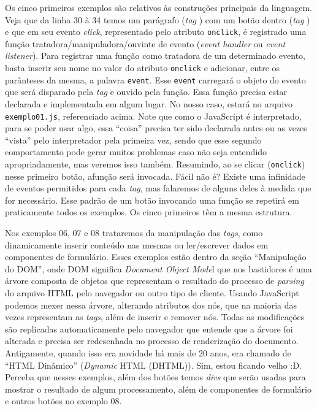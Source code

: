 Os cinco primeiros exemplos são relativos às construções principais da linguagem. Veja que da linha 30 à 34 temos um parágrafo (\textit{tag} ) com um botão dentro (\textit{tag} ) e que em seu evento \textit{click}, representado pelo atributo \texttt{onclick}, é registrado uma função tratadora/manipuladora/ouvinte de evento (\textit{event handler} ou \textit{event listener}). Para registrar uma função como tratadora de um determinado evento, basta inserir seu nome no valor do atributo \texttt{onclick} e adicionar, entre os parânteses da mesma, a palavra \texttt{event}. Esse \texttt{event} carregará o objeto do evento que será disparado pela \textit{tag} e ouvido pela função. Essa função precisa estar declarada e implementada em algum lugar. No nosso caso, estará no arquivo \texttt{exemplo01.js}, referenciado acima. Note que como o JavaScript é interpretado, para se poder usar algo, essa ``coisa'' precisa ter sido declarada antes ou as vezes ``vista'' pelo interpretador pela primeira vez, sendo que esse segundo comportamento pode gerar muitos problemas caso não seja entendido apropriadamente, mas veremos isso também. Resumindo, ao se clicar (\texttt{onclick}) nesse primeiro botão, afunção  será invocada. Fácil não é? Existe uma infinidade de eventos permitidos para cada \textit{tag}, mas falaremos de alguns deles à medida que for necessário. Esse padrão de um botão invocando uma função se repetirá em praticamente todos os exemplos. Os cinco primeiros têm a mesma estrutura.

Nos exemplos 06, 07 e 08 trataremos da manipulação das \textit{tags}, como dinamicamente inserir conteúdo nas mesmas ou ler/escrever dados em componentes de formulário. Esses exemplos estão dentro da seção ``Manipulação do DOM'', onde DOM significa \textit{Document Object Mode}l que nos bastidores é uma árvore composta de objetos que representam o resultado do processo de \textit{parsing} do arquivo HTML pelo navegador ou outro tipo de cliente. Usando JavaScript podemos mexer nessa árvore, alterando atributos dos nós, que na maioria das vezes representam as \textit{tags}, além de inserir e remover nós. Todas as modificações são replicadas automaticamente pelo navegador que entende que a árvore foi alterada e precisa ser redesenhada no processo de renderização do documento. Antigamente, quando isso era novidade há mais de 20 anos, era chamado de ``HTML Dinâmico'' (\textit{Dynamic} HTML (DHTML)). Sim, estou ficando velho :D. Perceba que nesses exemplos, além dos botões temos \textit{divs} que serão usadas para mostrar o resultado de algum processamento, além de componentes de formulário e outros botões no exemplo 08.

